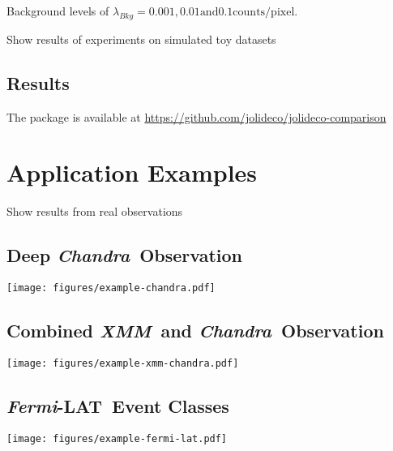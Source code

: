 \documentclass[twocolumn]{aastex631}
\newcommand{\chandra}{\textit{Chandra}~}
\newcommand{\xmm}{\textit{XMM}~}
\newcommand{\fermi}{\textit{Fermi}-LAT~}
\begin{document}
    Background levels of $\lambda_{Bkg}= 0.001, 0.01 \textrm{and} 0.1 \textrm{counts/pixel}$. 
    
    Show results of experiments on simulated toy datasets

    

    \subsection{Results}

    The package is available at \url{https://github.com/jolideco/jolideco-comparison}


    \section{Application Examples}
    Show results from real observations

    \subsection{Deep \chandra Observation}
    \begin{figure*}[ht!]
        \begin{centering}
            \texttt{[image: figures/example-chandra.pdf]}
            \caption{
                Chandra Example
            }
            \label{fig:example-chandra}
        \end{centering}
    \end{figure*}

    \subsection{Combined \xmm and \chandra Observation}
    \begin{figure*}[ht!]
        \begin{centering}
            \texttt{[image: figures/example-xmm-chandra.pdf]}
            \caption{
                Chandra Example
            }
            \label{fig:example-xmm-chandra}
        \end{centering}
    \end{figure*}


    \subsection{\fermi Event Classes}
    \begin{figure*}[ht!]
        \begin{centering}
            \texttt{[image: figures/example-fermi-lat.pdf]}
            \caption{
                Chandra Example
            }
            \label{fig:example-fermi-lat}
        \end{centering}
    \end{figure*}
\end{document}
